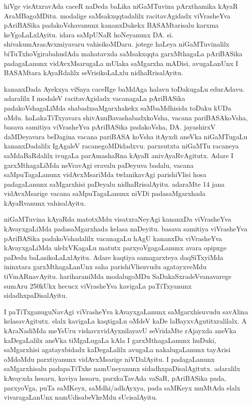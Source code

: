 \medskip

hiVge visAtxravAda caceR naDeda baLika niGaMTuvina pArxthamika kAyaR AraMBagoMDitu. modalige saMsakxqqta\-dalilx racita\-vAgidadx viVrasheYva pAriBASika padakoVshavanunx kananxDakekx BASAMtarisalu karxma keYgoLaLxlAyitu. idara saMpUNaR \hbox{hoNeyanunx} DA. si. shivakumAra\-sAvxmiyavaru vahisikoMDaru. jotege haLeya niGaMTuvinalilx biTuTxhoVgirabahudAda mahatavxda saMsakxqqta garxMthagaLa pAriBASika padagaLanunx vidAvxMsarugaLa mUlaka saMgarxha mADisi, avugaLanUnx I BASAMtara kAyaRdalilx seVrisikoLaLxlu nidhaRrisalAyitu.

\medskip

kananxDada Ayekxya viSaya caceRge baMdAga halavu toDakugaLu edurAdavu. adaralilx I modaleV racitavAgidadx vacanagaLa pAriBASika padakoVshagaLiMda shabadxsaMgarxhakekx saMbaMdhisida toDaku kUDa oMdu. haLakaTiTxyavara shivAnuBavashabadxkoVsha, vacana pariBASA\-koVsha, basava samitiya viVrasheYva pAriBASika padakoVsha, DA. jayashirxV daMDeyavara beDagina vacana pariBASA koVsha itAyxdi aneVka niGaMTugaLu kananxDadalilx IgAgaleV racanegoMDidadxvu. parxsutxta niGaMTu racaneya saMdaBaRdalilx ivugaLa parAmashaRna kAyaR anivAyaRvAgitutx. Adare I garxMthagaLiMda neVravAgi eravalu paDeyuva badalu, vacana saMpuTagaLanunx vidAvxMsariMda twlanika\-vAgi parishiVlisi hosa padagaLanunx saMgarxhisi paDeyalu nidhaRrisalAyitu. adaraMte 14 jana vidAvxMsarige vacana saMpuTagaLanunx niVDi padasaMgarxhada kAyaRvanunx vahisalAyitu.

\medskip

niGaMTuvina kAyaRda matotxMdu visatxraNeyAgi kananxDa viVrasheYva kAvayxgaLiMda padasaMgarxhada kelasa naDeyitu. basava \hbox{samitiya} viVrasheYva pAriBASika padakoVshadalilx vacanagaLu hAgU kananxDa viVrasheYva kAvayxgaLiMda ulelxVKagaLu matutx parxyoVga\-gaLanunx avara opipxge paDedu baLasikoLaLxlAyitu. Adare kaqtiya samagarxteya daqSiTxyiMda ininxtara garxMthagaLanUnx saha parishiVlisuvudu agatayxveMdu tiVmARnavAyitu. hariharaniMda modalugoMDu SaDakaSxradeVvanavarege sumAru 250kUkx hecucx viVrasheYva kavigaLa paTiTxyanunx sidadhxpaDisalAyitu. 

\medskip

I paTiTxganuguNavAgi viVrasheYva kAvayxgaLanunx saMgarxhisuvudu savAlina kelasavAgitutx. elalx kavigaLa kaqtigaLu oMdeV kaDe laBayxvAgutitxralilalx. A kAraNadiMda meYsUru vishavxvidAyxnilayavU seVridaMte rAjayxda aneVka kaDegaLalilx aneVka tiMgaLugaLa kAla I garxMthagaLanunx huDuki, saMgarxhisi agatayxbidadx kaDegaLalilx avugaLa nakalugaLanunx tayArisi oMdoMdu parxtiyanunx vidAvxMsarige niVDa\-lAyitu. I padagaLanunx saMgarxhisalu padapaTiTxke namUneyanunx sidadhxpaDisalAgitutx. adaralilx kAvayxda hesaru, kaviya hesaru, parxkaTavAda vaSaR, pAriBASika pada, parxyoVga, puTa saMKeyx, saMdhi/adhAyxya, pada saMKeyx muMtAda elalx vivaragaLanUnx namUdisabeVkeMdu sUcisalAyitu.

